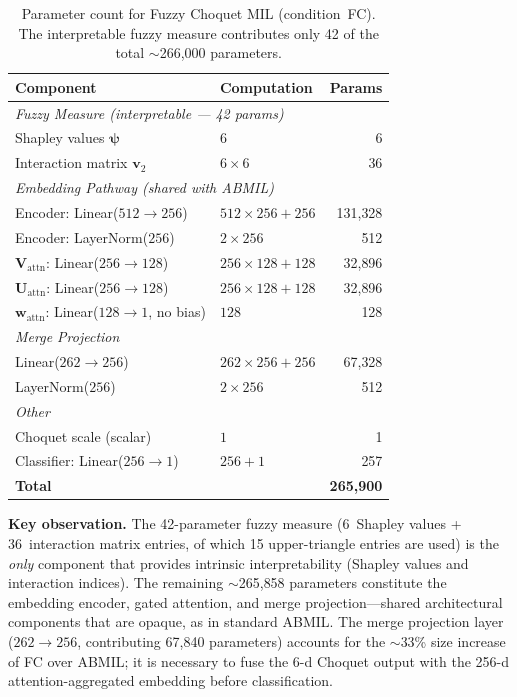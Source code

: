 \begin{table}[htbp]
\centering
\small
\caption{Parameter count for Fuzzy Choquet MIL (condition~FC).
The interpretable fuzzy measure contributes only 42 of the total
$\sim$266{,}000 parameters.}
\label{tab:params_choquet_detail}
\begin{tabular}{l l r}
\hline
\textbf{Component} & \textbf{Computation} & \textbf{Params} \\
\hline
\multicolumn{3}{l}{\textit{Fuzzy Measure (interpretable --- 42 params)}} \\
Shapley values $\boldsymbol{\psi}$       & $6$                        & 6 \\
Interaction matrix $\mathbf{v}_2$        & $6 \times 6$               & 36 \\
\hline
\multicolumn{3}{l}{\textit{Embedding Pathway (shared with ABMIL)}} \\
Encoder: Linear($512 \to 256$)           & $512 \times 256 + 256$     & 131{,}328 \\
Encoder: LayerNorm($256$)                & $2 \times 256$             & 512 \\
$\mathbf{V}_{\text{attn}}$: Linear($256 \to 128$)  & $256 \times 128 + 128$  & 32{,}896 \\
$\mathbf{U}_{\text{attn}}$: Linear($256 \to 128$)  & $256 \times 128 + 128$  & 32{,}896 \\
$\mathbf{w}_{\text{attn}}$: Linear($128 \to 1$, no bias) & $128$            & 128 \\
\hline
\multicolumn{3}{l}{\textit{Merge Projection}} \\
Linear($262 \to 256$)                    & $262 \times 256 + 256$     & 67{,}328 \\
LayerNorm($256$)                         & $2 \times 256$             & 512 \\
\hline
\multicolumn{3}{l}{\textit{Other}} \\
Choquet scale (scalar)                   & $1$                        & 1 \\
Classifier: Linear($256 \to 1$)          & $256 + 1$                 & 257 \\
\hline
\textbf{Total}                           &                           & \textbf{265{,}900} \\
\hline
\end{tabular}
\end{table}

\textbf{Key observation.}
The 42-parameter fuzzy measure (6~Shapley values + 36~interaction
matrix entries, of which 15 upper-triangle entries are used) is the
\emph{only} component that provides intrinsic interpretability
(Shapley values and interaction indices).
The remaining $\sim$265{,}858 parameters constitute the embedding
encoder, gated attention, and merge projection---shared architectural
components that are opaque, as in standard ABMIL.
The merge projection layer ($262 \to 256$, contributing 67{,}840
parameters) accounts for the $\sim$33\% size increase of FC over
ABMIL; it is necessary to fuse the 6-d Choquet output with the
256-d attention-aggregated embedding before classification.
